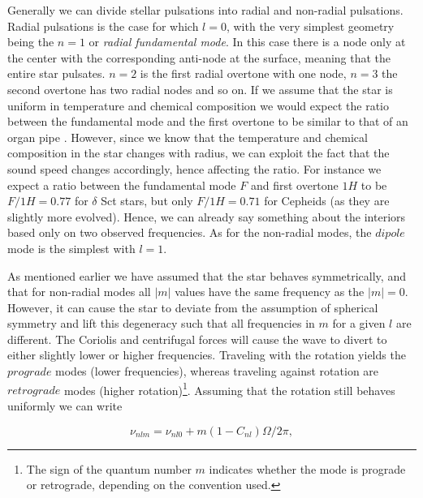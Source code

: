 Generally we can divide stellar pulsations into radial and non-radial pulsations. Radial pulsations is the case for which $l=0$, with the very simplest geometry being the $n=1$ or \textit{radial fundamental mode}. In this case there is a node only at the center with the corresponding anti-node at the surface, meaning that the entire star pulsates. $n=2$ is the first radial overtone with one node, $n=3$ the second overtone has two radial nodes and so on. %
If we assume that the star is uniform in temperature and chemical composition we would expect the ratio between the fundamental mode and the first overtone to be similar to that of an organ pipe \citep{aerts2010}. However, since we know that the temperature and chemical composition in the star changes with radius, we can exploit the fact that the sound speed changes accordingly, hence affecting the ratio. For instance we expect a ratio between the fundamental mode $F$ and first overtone $1H$ to be $F/1H = 0.77$ for $\delta$ Sct stars, but only $F/1H=0.71$ for Cepheids (as they are slightly more evolved). Hence, we can already say something about the interiors based only on two observed frequencies. As for the non-radial modes, the $dipole$ mode is the simplest with $l=1$. 

As mentioned earlier we have assumed that the star behaves symmetrically, and that for non-radial modes all $|m|$ values have the same frequency as the $|m|=0$. However, it can cause the star to deviate from the assumption of spherical symmetry and lift this degeneracy such that all frequencies in $m$ for a given $l$ are different. The Coriolis and centrifugal forces will cause the wave to divert to either slightly lower or higher frequencies. Traveling with the rotation yields the $prograde$ modes (lower frequencies), whereas traveling against rotation are $retrograde$ modes (higher rotation)\footnote{The sign of the quantum number $m$ indicates whether the mode is prograde or retrograde, depending on the convention used.}. Assuming that the rotation still behaves uniformly we can write 

\begin{equation}
    \nu_{nlm} = \nu_{nl0}+ m(1-C_{nl})\Omega/2\pi,
\end{equation}

